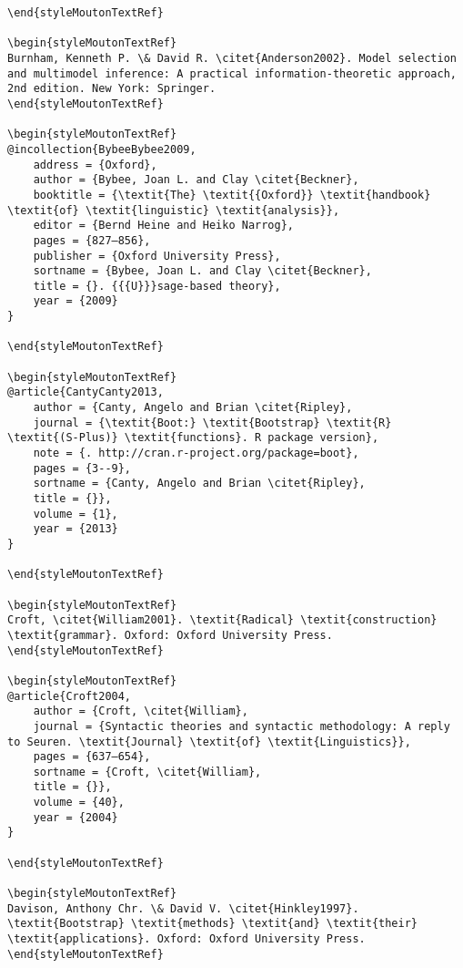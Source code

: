 \begin{styleMoutonHeadingRef}
\begin{verbatim}
\end{styleMoutonTextRef}

\begin{styleMoutonTextRef}
Burnham, Kenneth P. \& David R. \citet{Anderson2002}. Model selection and multimodel inference: A practical information-theoretic approach, 2nd edition. New York: Springer.
\end{styleMoutonTextRef}

\begin{styleMoutonTextRef}
@incollection{BybeeBybee2009,
	address = {Oxford},
	author = {Bybee, Joan L. and Clay \citet{Beckner},
	booktitle = {\textit{The} \textit{{Oxford}} \textit{handbook} \textit{of} \textit{linguistic} \textit{analysis}},
	editor = {Bernd Heine and Heiko Narrog},
	pages = {827–856},
	publisher = {Oxford University Press},
	sortname = {Bybee, Joan L. and Clay \citet{Beckner},
	title = {}. {{{U}}}sage-based theory},
	year = {2009}
}

\end{styleMoutonTextRef}

\begin{styleMoutonTextRef}
@article{CantyCanty2013,
	author = {Canty, Angelo and Brian \citet{Ripley},
	journal = {\textit{Boot:} \textit{Bootstrap} \textit{R} \textit{(S-Plus)} \textit{functions}. R package version},
	note = {. http://cran.r-project.org/package=boot},
	pages = {3--9},
	sortname = {Canty, Angelo and Brian \citet{Ripley},
	title = {}},
	volume = {1},
	year = {2013}
}

\end{styleMoutonTextRef}

\begin{styleMoutonTextRef}
Croft, \citet{William2001}. \textit{Radical} \textit{construction} \textit{grammar}. Oxford: Oxford University Press.
\end{styleMoutonTextRef}

\begin{styleMoutonTextRef}
@article{Croft2004,
	author = {Croft, \citet{William},
	journal = {Syntactic theories and syntactic methodology: A reply to Seuren. \textit{Journal} \textit{of} \textit{Linguistics}},
	pages = {637–654},
	sortname = {Croft, \citet{William},
	title = {}},
	volume = {40},
	year = {2004}
}

\end{styleMoutonTextRef}

\begin{styleMoutonTextRef}
Davison, Anthony Chr. \& David V. \citet{Hinkley1997}. \textit{Bootstrap} \textit{methods} \textit{and} \textit{their} \textit{applications}. Oxford: Oxford University Press.
\end{styleMoutonTextRef}


\end{verbatim}
\end{styleMoutonHeadingRef}
